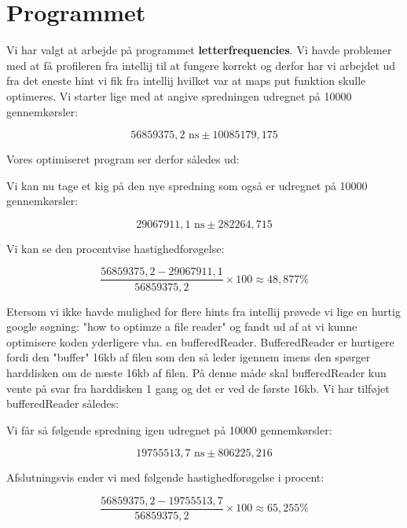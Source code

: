 \documentclass[class=report, crop=false]{standalone}
\begin{document}
    \section{Programmet}
    Vi har valgt at arbejde på programmet \textbf{letterfrequencies}. Vi havde problemer med at få profileren fra intellij til at fungere korrekt og derfor har vi arbejdet ud fra det eneste hint vi fik fra intellij hvilket var at maps put funktion skulle optimeres.
    Vi starter lige med at angive spredningen udregnet på 10000 gennemkørsler:
    \begin{tcolorbox}
        \[ 56859375,2 \text{ ns} \pm 10085179,175   \]
    \end{tcolorbox}

    \noindent Vores optimiseret program ser derfor således ud: 
    \lstset{style=codestyle}
    

    \noindent Vi kan nu tage et kig på den nye spredning som også er udregnet på 10000 gennemkørsler:
    \begin{tcolorbox}
        \[ 29067911,1 \text{ ns} \pm 282264,715  \]
    \end{tcolorbox}

    \noindent Vi kan se den procentvise hastighedforøgelse:
    \begin{tcolorbox}
        \[ \frac{56859375,2 - 29067911,1}{56859375,2} \times 100 \approx 48,877\% \]
    \end{tcolorbox}

    \noindent Etersom vi ikke havde mulighed for flere hints fra intellij prøvede vi lige en hurtig google søgning: "how to optimze a file reader" og fandt ud af at vi kunne optimisere koden yderligere vha. en bufferedReader. 
    BufferedReader er hurtigere fordi den "buffer" 16kb af filen som den så leder igennem imens den spørger harddisken om de næste 16kb af filen. På denne måde skal bufferedReader kun vente på svar fra harddisken 1 gang og det er ved de første 16kb. Vi har tilføjet bufferedReader således:
    \lstset{style=codestyle}
    
    
    \noindent Vi får så følgende spredning igen udregnet på 10000 gennemkørsler:
    \begin{tcolorbox}
        \[ 19755513,7 \text{ ns} \pm 806225,216  \]
    \end{tcolorbox}

    \noindent Afslutningsvis ender vi med følgende hastighedforøgelse i procent:
    \begin{tcolorbox}
        \[ \frac{56859375,2 - 19755513,7}{56859375,2} \times 100 \approx 65,255\% \]
    \end{tcolorbox}
\end{document}
